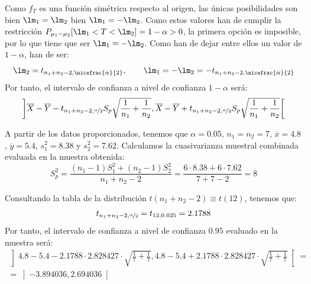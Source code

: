 \begin{ejercicio}
\begin{equation*}
    \end{equation*}
    Como $f_T$ es una función simétrica respecto al origen, las únicas posibilidades son bien $\lm_1 = \lm_2$ bien $\lm_1 = -\lm_2$. Como estos valores han de cumplir la restricción $P_{\mu_1-\mu_2}[\lm_1<T<\lm_2]=1-\alpha > 0$, la primera opción es imposible, por lo que tiene que ser $\lm_1 = -\lm_2$. Como han de dejar entre ellos un valor de $1-\alpha$, han de ser:
    \begin{equation*}
        \lm_2 = t_{n_1+n_2-2,\nicefrac{\alpha}{2}}, \qquad \lm_1 = -\lm_2 = -t_{n_1+n_2-2,\nicefrac{\alpha}{2}}
    \end{equation*}
    Por tanto, el intervalo de confianza a nivel de confianza $1-\alpha$ será:
    \begin{equation*}
        \left]\overline{X}-\overline{Y}-t_{n_1+n_2-2,\nicefrac{\alpha}{2}}S_p\sqrt{\frac{1}{n_1}+\frac{1}{n_2}},\overline{X}-\overline{Y}+t_{n_1+n_2-2,\nicefrac{\alpha}{2}}S_p\sqrt{\frac{1}{n_1}+\frac{1}{n_2}}\right[
    \end{equation*}

    A partir de los datos proporcionados, tenemos que $\alpha=0.05$, $n_1=n_2=7$, $\overline{x} = 4.8$, $\overline{y} = 5.4$, $s_1^2 = 8.38$ y $s_2^2 = 7.62$. Calculamos la cuasivarianza muestral combinada evaluada en la muestra obtenida:
    \begin{equation*}
        S_p^2 = \frac{(n_1-1)S_1^2 + (n_2-1)S_2^2}{n_1+n_2-2} = \frac{6\cdot 8.38 + 6\cdot 7.62}{7+7-2} = 8
    \end{equation*}
    
    Consultando la tabla de la distribución $t(n_1+n_2-2)\equiv t(12)$, tenemos que:
    \begin{equation*}
        t_{n_1+n_2-2,\nicefrac{\alpha}{2}} = t_{12,0.025} = 2.1788
    \end{equation*}
    Por tanto, el intervalo de confianza a nivel de confianza $0.95$ evaluado en la muestra será:
    \begin{multline*}
        \left]4.8-5.4-2.1788\cdot 2.828427\cdot \sqrt{\frac{1}{7}+\frac{1}{7}},4.8-5.4+2.1788\cdot 2.828427\cdot \sqrt{\frac{1}{7}+\frac{1}{7}}\right[ =\\= \left]-3.894036, 2.694036\right[
    \end{multline*}
\end{ejercicio}

